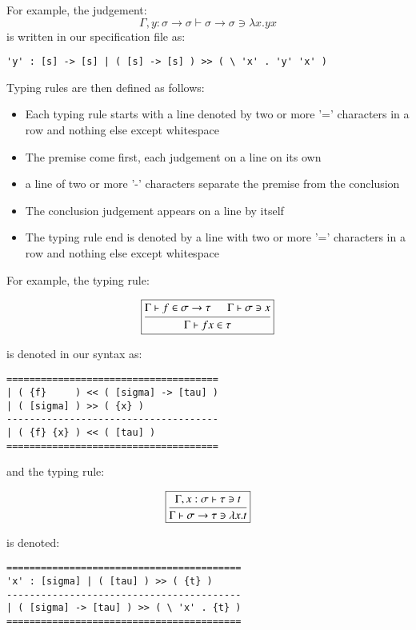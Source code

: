 For example, the judgement:
$$\Gamma, y : \sigma \to \sigma \vdash \sigma \to \sigma \ni \lambda x
. y x$$
is written in our specification file as:
\begin{verbatim}
'y' : [s] -> [s] | ( [s] -> [s] ) >> ( \ 'x' . 'y' 'x' )
\end{verbatim}

Typing rules are then defined as follows:
\begin{itemize}
  \item Each typing rule starts with a line denoted by two or more '='
    characters in a row and nothing else except whitespace
  \item The premise come first, each judgement on a line on its own
  \item a line of two or more '-' characters separate the premise from
    the conclusion
  \item The conclusion judgement appears on a line by itself
  \item The typing rule end is denoted by a line with two or more '='
    characters in a row and nothing else except whitespace
\end{itemize}

For example, the typing rule:

$$\boxed{
\mbox{\begin {prooftree}
    \hypo{\Gamma \vdash f \in \sigma \to \tau}
    \hypo{\Gamma \vdash \sigma \ni x}
  \infer2[]{\Gamma \vdash f x \in \tau}
\end {prooftree}}
}$$

is denoted in our syntax as:

\begin{center}
\begin{BVerbatim}
=====================================
| ( {f}     ) << ( [sigma] -> [tau] )
| ( [sigma] ) >> ( {x} )
-------------------------------------
| ( {f} {x} ) << ( [tau] )
=====================================
\end{BVerbatim}
\end{center}

and the typing rule:

$$\boxed{
\mbox{\begin {prooftree}
  \hypo{\Gamma , x : \sigma \vdash \tau \ni t }
  \infer1[]{\Gamma \vdash \sigma \to \tau \ni \lambda x . t}
\end {prooftree}}
}$$

is denoted:

\begin{center}
\begin{BVerbatim}
=========================================
'x' : [sigma] | ( [tau] ) >> ( {t} )
-----------------------------------------
| ( [sigma] -> [tau] ) >> ( \ 'x' . {t} )
=========================================
\end{BVerbatim}
\end{center}


